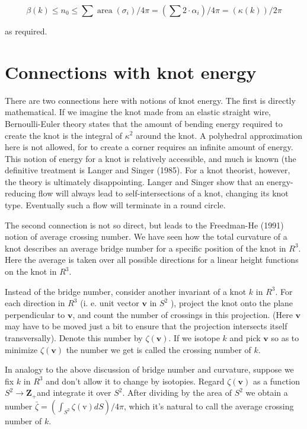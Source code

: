 \documentclass[10pt, letterpaper]{article}
\begin{document}
$$
\beta(k) \leq n_{0} \leq \sum \operatorname{area}\left(\sigma_{i}\right) / 4 \pi=\left(\sum 2 \cdot \alpha_{i}\right) / 4 \pi=(\kappa(k)) / 2 \pi
$$

as required.

\section*{Connections with knot energy}
There are two connections here with notions of knot energy. The first is directly mathematical. If we imagine the knot made from an elastic straight wire, Bernoulli-Euler theory states that the amount of bending energy required to create the knot is the integral of $\kappa^{2}$ around the knot. A polyhedral approximation here is not allowed, for to create a corner requires an infinite amount of energy. This notion of energy for a knot is relatively accessible, and much is known (the definitive treatment is Langer and Singer (1985). For a knot theorist, however, the theory is ultimately disappointing. Langer and Singer show that an energy-reducing flow will always lead to self-intersections of a knot, changing its knot type. Eventually such a flow will terminate in a round circle.

The second connection is not so direct, but leads to the Freedman-He (1991) notion of average crossing number. We have seen how the total curvature of a knot describes an average bridge number for a specific position of the knot in $R^{3}$. Here the average is taken over all possible directions for a linear height functions on the knot in $R^{3}$.

Instead of the bridge number, consider another invariant of a knot $k$ in $R^{3}$. For each direction in $R^{3}$ (i. e. unit vector $\mathbf{v}$ in $S^{2}$ ), project the knot onto the plane perpendicular to $\mathbf{v}$, and count the number of crossings in this projection. (Here $\mathbf{v}$ may have to be moved just a bit to ensure that the projection intersects itself transversally). Denote this number by $\zeta(\mathbf{v})$. If we isotope $k$ and pick $\mathbf{v}$ so as to minimize $\zeta(\mathbf{v})$ the number we get is called the crossing number of $k$.

In analogy to the above discussion of bridge number and curvature, suppose we fix $k$ in $R^{3}$ and don't allow it to change by isotopies. Regard $\zeta(\mathbf{v})$ as a function $S^{2} \rightarrow \mathbf{Z}_{+}$and integrate it over $S^{2}$. After dividing by the area of $S^{2}$ we obtain a number $\bar{\zeta}=\left(\int_{S^{2}} \zeta(\mathrm{v}) d S\right) / 4 \pi$, which it's natural to call the average crossing number of $k$.
\end{document}
